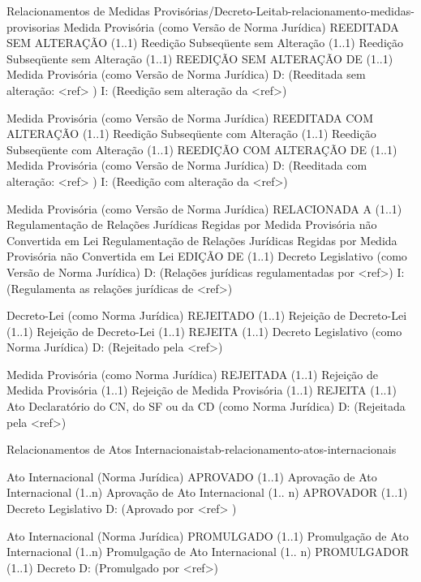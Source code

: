 \begin{tabelarelacionamento}{Relacionamentos
de Medidas Provisórias/Decreto-Lei}{tab-relacionamento-medidas-provisorias}
  \relacionamento
  	{Medida Provisória (como Versão de Norma Jurídica)}
 	{REEDITADA SEM ALTERAÇÃO  (1..1)}
 	{Reedição Subseqüente sem Alteração}
 	{(1..1) Reedição Subseqüente sem Alteração (1..1)}
 	{REEDIÇÃO SEM ALTERAÇÃO  DE  (1..1)}
 	{Medida Provisória (como Versão de Norma Jurídica)}
 	{D: (Reeditada sem alteração: <ref> )
	 \mypar
	 I: (Reedição sem alteração da <ref>)}

  \relacionamento
  	{Medida Provisória (como Versão de Norma Jurídica)}
 	{REEDITADA COM ALTERAÇÃO (1..1)}
 	{Reedição Subseqüente com Alteração}
 	{(1..1) Reedição Subseqüente com Alteração (1..1)}
 	{REEDIÇÃO COM ALTERAÇÃO DE  (1..1)}
 	{Medida Provisória (como Versão de Norma Jurídica)}
 	{D: (Reeditada com alteração: <ref> )
	 \mypar
	 I: (Reedição com alteração da <ref>)}

  \relacionamento
  	{Medida Provisória (como Versão de Norma Jurídica)}
 	{RELACIONADA A (1..1)}
 	{Regulamentação de Relações Jurídicas Regidas por Medida Provisória não Convertida em Lei}
 	{Regulamentação de Relações Jurídicas Regidas por Medida Provisória não Convertida em Lei}
 	{EDIÇÃO DE (1..1)}
 	{Decreto Legislativo (como Versão de Norma Jurídica)}
 	{D: (Relações jurídicas regulamentadas por <ref>)
	 \mypar
	 I: (Regulamenta as relações jurídicas de <ref>)}

  \relacionamento
  	{Decreto-Lei (como Norma Jurídica)}
 	{REJEITADO (1..1)}
 	{Rejeição de Decreto-Lei}
 	{(1..1) Rejeição de Decreto-Lei (1..1)}
 	{REJEITA (1..1)}
 	{Decreto Legislativo (como Norma Jurídica)}
 	{D: (Rejeitado pela <ref>)}

  \relacionamento
  	{Medida Provisória (como Norma Jurídica)}
 	{REJEITADA (1..1)}
 	{Rejeição de Medida Provisória}
 	{(1..1) Rejeição de Medida Provisória (1..1)}
 	{REJEITA (1..1)}
 	{Ato Declaratório do CN, do SF ou da CD (como Norma Jurídica)}
 	{D: (Rejeitada pela <ref>)}

\end{tabelarelacionamento}


\begin{tabelarelacionamento}{Relacionamentos
de Atos Internacionais}{tab-relacionamento-atos-internacionais}

  \relacionamento
  	{Ato Internacional (Norma Jurídica)}
 	{APROVADO (1..1)}
 	{Aprovação de Ato Internacional}
 	{(1..n) Aprovação de Ato Internacional (1.. n)}
 	{APROVADOR (1..1)}
 	{Decreto Legislativo}
 	{D: (Aprovado por <ref> )}

  \relacionamento
  	{Ato Internacional (Norma Jurídica)}
 	{PROMULGADO (1..1)}
 	{Promulgação de Ato Internacional}
 	{(1..n) Promulgação de Ato Internacional (1.. n)}
 	{PROMULGADOR (1..1)}
 	{Decreto}
 	{D: (Promulgado por <ref>)}

\end{tabelarelacionamento}
